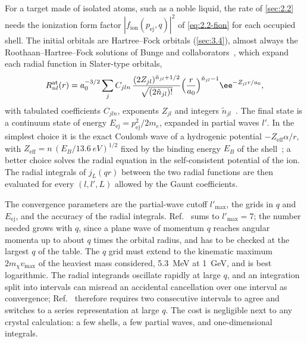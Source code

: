 For a target made of isolated atoms, such as a noble liquid, the rate of \cref{sec:2.2} needs the ionization form factor $|f_{\mathrm{ion}}(p_{\mathrm{ej}},q)|^2$ of \cref{eq:2.2-fion} for each occupied shell. The initial orbitals are Hartree--Fock orbitals (\cref{sec:3.4}), almost always the Roothaan--Hartree--Fock solutions of Bunge and collaborators~\cite{bunge1993roothaan}, which expand each radial function in Slater-type orbitals,
\begin{equation}
  R^{\mathrm{at}}_{nl}(r) = a_0^{-3/2}\sum_j C_{jln}\,\frac{(2Z_{jl})^{\tilde n_{jl}+1/2}}{\sqrt{(2\tilde n_{jl})!}}\Bigl(\frac{r}{a_0}\Bigr)^{\tilde n_{jl}-1}\ee^{-Z_{jl}r/a_0} ,
  \label{eq:E.7-sto}
\end{equation}
with tabulated coefficients $C_{jln}$, exponents $Z_{jl}$ and integers $\tilde n_{jl}$~\cite[Eq.~(B33)]{catena2020atomic}. The final state is a continuum state of energy $E_{\mathrm{ej}} = p_{\mathrm{ej}}^2/2m_e$, expanded in partial waves $l'$. In the simplest choice it is the exact Coulomb wave of a hydrogenic potential $-Z_{\mathrm{eff}}\alpha/r$, with $Z_{\mathrm{eff}} = n\,(E_B/\SI{13.6}{eV})^{1/2}$ fixed by the binding energy $E_B$ of the shell~\cite[Eqs.~(B34) and~(B35)]{catena2020atomic}; a better choice solves the radial equation in the self-consistent potential of the ion. The radial integrals of $j_L(qr)$ between the two radial functions are then evaluated for every $(l, l', L)$ allowed by the Gaunt coefficients.

The convergence parameters are the partial-wave cutoff $l'_{\mathrm{max}}$, the grids in $q$ and $E_{\mathrm{ej}}$, and the accuracy of the radial integrals. Ref.~\cite[footnote~11]{catena2020atomic} sums to $l'_{\mathrm{max}} = 7$; the number needed grows with $q$, since a plane wave of momentum $q$ reaches angular momenta up to about $q$ times the orbital radius, and has to be checked at the largest $q$ of the table. The $q$ grid must extend to the kinematic maximum $2m_\chi v_{\mathrm{max}}$ of the heaviest mass considered, \SI{5.3}{MeV} at \SI{1}{GeV}, and is best logarithmic. The radial integrands oscillate rapidly at large $q$, and an integration split into intervals can misread an accidental cancellation over one interval as convergence; Ref.~\cite[Appendix~B\,5]{catena2020atomic} therefore requires two consecutive intervals to agree and switches to a series representation at large $q$. The cost is negligible next to any crystal calculation: a few shells, a few partial waves, and one-dimensional integrals.

